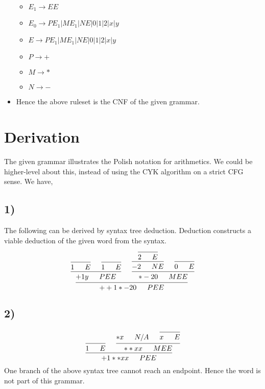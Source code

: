 \documentclass{article}
\theoremstyle{definition}
\theoremstyle{remark}
\begin{document}
\begin{itemize}
    \begin{itemize}
        \item $E_1 \rightarrow EE$
        \item $E_0 \rightarrow PE_1 | ME_1 | NE | 0 | 1 | 2 | x | y$
        \item $E \rightarrow PE_1 | ME_1 | NE | 0 | 1 | 2 | x | y$
        \item $P \rightarrow +$
        \item $M \rightarrow *$
        \item $N \rightarrow -$
    \end{itemize}
    \item Hence the above ruleset is the CNF of the given grammar.
\end{itemize}

\section{Derivation}

The given grammar illustrates the Polish notation for arithmetics. We could be higher-level about this, instead of using the CYK algorithm on a strict CFG sense. We have,

\subsection{1)}
The following can be derived by syntax tree deduction. Deduction constructs a viable deduction of the given word from the syntax.
\[
\begin{prooftree}
                \hypo{}
            \infer 1 {1 \enskip \quad E}
                \hypo{}
            \infer 1 {1 \enskip \quad E}
        \infer 2 {+ 1 y \enskip \quad PEE}
                    \hypo {}
                \infer 1 {2 \enskip \quad E}
            \infer 1 {-2 \enskip \quad NE}
                \hypo {}
            \infer 1 {0 \enskip \quad E}
        \infer 2 {* -2 0 \enskip \quad MEE}
    \infer 2 {+ + 1 * -2 0 \enskip \quad PEE}
\end{prooftree}
\]

\subsection{2)}
\[
\begin{prooftree}
            \hypo {}
        \infer 1 {1 \enskip \quad E}
            \hypo {* x \enskip \quad N/A}
                \hypo {}
            \infer 1 {x \enskip \quad E}
        \infer 2 {* * x x \enskip \quad MEE}
    \infer 2 {+ 1 * * x x \enskip \quad PEE}
\end{prooftree}
\]
One branch of the above syntax tree cannot reach an endpoint. Hence the word is not part of this grammar.
\end{document}

